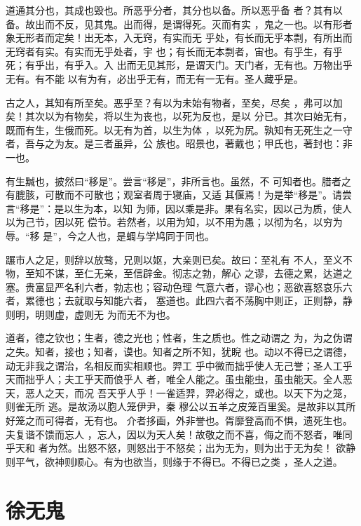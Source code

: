 \documentclass[a4paper,12pt,UTF8,twoside]{ctexbook}
\begin{document}
道通其分也，其成也毁也。所恶乎分者，其分也以备。所以恶乎备 者？其有以备。故出而不反，见其鬼。出而得，是谓得死。灭而有实 ，鬼之一也。以有形者象无形者而定矣！出无本，入无窍，有实而无 乎处，有长而无乎本剽，有所出而无窍者有实。有实而无乎处者，宇 也；有长而无本剽者，宙也。有乎生，有乎死；有乎出，有乎入。入 出而无见其形，是谓天门。天门者，无有也。万物出乎无有。有不能 以有为有，必出乎无有，而无有一无有。圣人藏乎是。

古之人，其知有所至矣。恶乎至？有以为未始有物者，至矣，尽矣 ，弗可以加矣！其次以为有物矣，将以生为丧也，以死为反也，是以 分已。其次曰始无有，既而有生，生俄而死。以无有为首，以生为体 ，以死为尻。孰知有无死生之一守者，吾与之为友。是三者虽异，公 族也。昭景也，著戴也；甲氏也，著封也：非一也。

有生黬也，披然曰“移是”。尝言“移是”，非所言也。虽然，不 可知者也。腊者之有膍胲，可散而不可散也；观室者周于寝庙，又适 其偃焉！为是举“移是”。请尝言“移是”：是以生为本，以知 为师，因以乘是非。果有名实，因以己为质，使人以为己节，因以死 偿节。若然者，以用为知，以不用为愚；以彻为名，以穷为辱。“移 是”，今之人也，是蜩与学鸠同于同也。

蹍市人之足，则辞以放骜，兄则以妪，大亲则已矣。故曰：至礼有 不人，至义不物，至知不谋，至仁无亲，至信辟金。彻志之勃，解心 之谬，去德之累，达道之塞。贵富显严名利六者，勃志也；容动色理 气意六者，谬心也；恶欲喜怒哀乐六者，累德也；去就取与知能六者， 塞道也。此四六者不荡胸中则正，正则静，静则明，明则虚，虚则无 为而无不为也。

道者，德之钦也；生者，德之光也；性者，生之质也。性之动谓之 为，为之伪谓之失。知者，接也；知者，谟也。知者之所不知，犹睨 也。动以不得已之谓德，动无非我之谓治，名相反而实相顺也。羿工 乎中微而拙乎使人无己誉；圣人工乎天而拙乎人；夫工乎天而俍乎人 者，唯全人能之。虽虫能虫，虽虫能天。全人恶天，恶人之天，而况 吾天乎人乎！一雀适羿，羿必得之，或也。以天下为之笼，则雀无所 逃。是故汤以胞人笼伊尹，秦 穆公以五羊之皮笼百里奚。是故非以其所好笼之而可得者，无有也。 介者拸画，外非誉也。胥靡登高而不惧，遗死生也。夫复谐不馈而忘人 ，忘人，因以为天人矣！故敬之而不喜，侮之而不怒者，唯同乎天和 者为然。出怒不怒，则怒出于不怒矣；出为无为，则为出于无为矣！ 欲静则平气，欲神则顺心。有为也欲当，则缘于不得已。不得已之类 ，圣人之道。
\section{徐无鬼}
\end{document}

